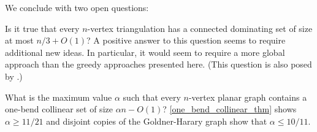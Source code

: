\documentclass[11pt]{article}
\theoremstyle{definition}
\begin{document}
We conclude with two open questions:

\begin{compactenum}
  \item Is it true that every $n$-vertex triangulation has a connected dominating set of size at most $n/3+O(1)$?  A positive answer to this question seems to require additional new ideas.  In particular, it would seem to require a more global approach than the greedy approaches presented here. (This question is also posed by \citet[Question~4.2]{bradshaw.masarik.ea:robust}.)

  \item What is the maximum value $\alpha$ such that every $n$-vertex planar graph contains a one-bend collinear set of size $\alpha n-O(1)$?  \cref{one_bend_collinear_thm} shows $\alpha \ge 11/21$ and disjoint copies of the Goldner-Harary graph show that $\alpha \le 10/11$.

\end{compactenum}








% 
\end{document}
